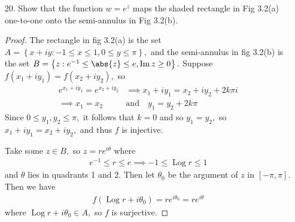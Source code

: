 \documentclass{article}
\DeclareMathOperator{\im}{Im}
\DeclareMathOperator{\Log}{Log}
\begin{document}
\begin{itemize}
\begin{enumerate}[(a)]
		\end{enumerate}

	\item[20.] Show that the function $w=e^z$ maps the shaded rectangle in Fig 3.2(a) one-to-one onto the semi-annulus in Fig 3.2(b).
		\begin{proof}
			The rectangle in fig 3.2(a) is the set $A=\left\{ x+iy:-1\le x\le 1, 0\le y\le \pi \right\},$ and the semi-annulus in fig 3.2(b) is the set $B=\left\{ z:e^{-1}\le \abs{z}\le e, \im z \ge 0 \right\}.$ Suppose $f(x_1+iy_1)=f(x_2+iy_2),$ so 
			\begin{align*}
				e^{x_1+iy_1} = e^{x_2+iy_2} &\implies x_1 + iy_1 = x_2 + iy_2 + 2k\pi i \\
				\implies x_1 = x_2 \quad &\text{and}\quad y_1 = y_2 + 2k\pi
			\end{align*}
			Since $0\le y_1, y_2\le \pi,$ it follows that $k=0$ and so $y_1=y_2,$ so $x_1+iy_1=x_2+iy_2,$ and thus $f$ is injective.

			Take some $z\in B,$ so $z=re^{i\theta}$ where
			\begin{align*}
				e^{-1}\le r\le e\implies -1 \le \Log r \le 1
			\end{align*}
			and $\theta$ lies in quadrants 1 and 2. Then let $\theta_0$ be the argument of $z$ in $[-\pi, \pi].$ Then we have
			\begin{align*}
				f(\Log r + i\theta_0) = re^{i\theta_0} = re^{i\theta}
			\end{align*}
			where $\Log r + i\theta_0\in A,$ so $f$ is surjective.
		\end{proof}


\end{itemize}
\end{document}

